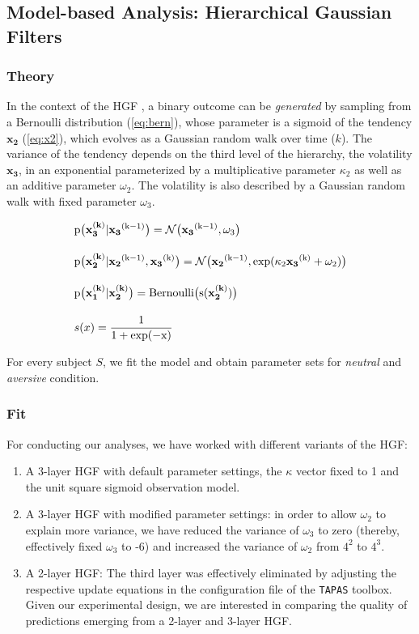 \documentclass{article}
\begin{document}
\begin{multicols}{2}
\subsection*{Model-based Analysis: Hierarchical Gaussian Filters} 
\label{hgf-methods}
\subsubsection*{Theory}
In the context of the HGF \citep{Mathys2014}, a binary outcome can be \textit{generated} by sampling from a Bernoulli distribution (\ref{eq:bern}), whose parameter is a sigmoid of the \textsf{tendency} $\mathbf{x_{2}}$ (\ref{eq:x2}), which evolves as a Gaussian random walk over time ($k$). The variance of the tendency depends on the third level of the hierarchy, the \textsf{volatility} $\mathbf{x_{3}}$, in an exponential parameterized by a multiplicative parameter $\kappa_{2}$ as well as an additive parameter $\omega_{2}$. The volatility is also described by a Gaussian random walk with fixed parameter $\omega_{3}$.

\begin{align}
&\rm p\big(\mathbf{x_{3}^{(k)}}|\mathbf{x_{3}}^{(k-1)}\big) = \mathcal{N}\big(\mathbf{x_{3}}^{(k-1)},\omega_{3}\big) \\[1em]
&\rm p\big(\mathbf{x_{2}^{(k)}}|\mathbf{x_{2}}^{(k-1)},\mathbf{x_{3}}^{(k)}\big) = \mathcal{N}\big(\mathbf{x_{2}}^{(k-1)},\rm exp(\kappa_{2}\mathbf{x_{3}}^{(k)}+\omega_{2})\big) \label{eq:x2}\\[1em] 
&\rm p\big(\mathbf{x_{1}^{(k)}}|\mathbf{x_{2}^{(k)}}\big) = \rm Bernoulli\big(s(\mathbf{x_{2}^{(k)}})\big) \label{eq:bern} \\[1em]
&s(x) = \frac{1}{1+\rm exp(-x)}
\end{align}

For every subject $S$, we fit the model and obtain parameter sets for \textit{neutral} and \textit{aversive} condition. \\

\subsubsection*{Fit}
For conducting our analyses, we have worked with different variants of the HGF: 

\begin{enumerate}
\item A 3-layer HGF with default parameter settings, the $\kappa$ vector fixed to 1 and the unit square sigmoid observation model.
\item A 3-layer HGF with modified parameter settings: in order to allow $\omega_2$ to explain more variance, we have reduced the variance of $\omega_3$ to zero (thereby, effectively fixed $\omega_3$ to -6) and increased the variance of $\omega_2$ from $4^2$ to $4^3$. 
\item A 2-layer HGF: The third layer was effectively eliminated by adjusting the respective update equations in the configuration file of the \texttt{TAPAS} toolbox. Given our experimental design, we are interested in comparing the quality of predictions emerging from a 2-layer and 3-layer HGF. 
\end{enumerate}


\end{multicols}
\end{document}
